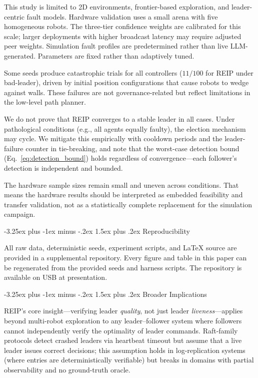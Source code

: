 \documentclass[conference]{IEEEtran}
\makeatletter
\renewcommand{\subsection}{\@startsection{subsection}{2}{\z@}%
  {-3.25ex plus -1ex minus -.2ex}%
  {1.5ex plus .2ex}%
  {\normalfont\normalsize\itshape\centering}}
\makeatother
\begin{document}
This study is limited to 2D environments, frontier-based exploration, and leader-centric fault models. Hardware validation uses a small arena with five homogeneous robots. The three-tier confidence weights are calibrated for this scale; larger deployments with higher broadcast latency may require adjusted peer weights. Simulation fault profiles are predetermined rather than live LLM-generated. Parameters are fixed rather than adaptively tuned.

Some seeds produce catastrophic trials for all controllers ($11/100$ for REIP under bad-leader), driven by initial position configurations that cause robots to wedge against walls. These failures are not governance-related but reflect limitations in the low-level path planner.

We do not prove that REIP converges to a stable leader in all cases. Under pathological conditions (e.g., all agents equally faulty), the election mechanism may cycle. We mitigate this empirically with cooldown periods and the leader-failure counter in tie-breaking, and note that the worst-case detection bound (Eq.~\ref{eq:detection_bound}) holds regardless of convergence---each follower's detection is independent and bounded.

The hardware sample sizes remain small and uneven across conditions. That means the hardware results should be interpreted as embedded feasibility and transfer validation, not as a statistically complete replacement for the simulation campaign.

\subsection{Reproducibility}

All raw data, deterministic seeds, experiment scripts, and \LaTeX{} source are provided in a supplemental repository. Every figure and table in this paper can be regenerated from the provided seeds and harness scripts. The repository is available on USB at presentation.

\subsection{Broader Implications}

REIP's core insight---verifying leader \emph{quality}, not just leader \emph{liveness}---applies beyond multi-robot exploration to any leader--follower system where followers cannot independently verify the optimality of leader commands. Raft-family protocols detect crashed leaders via heartbeat timeout but assume that a live leader issues correct decisions; this assumption holds in log-replication systems (where entries are deterministically verifiable) but breaks in domains with partial observability and no ground-truth oracle.
\end{document}
